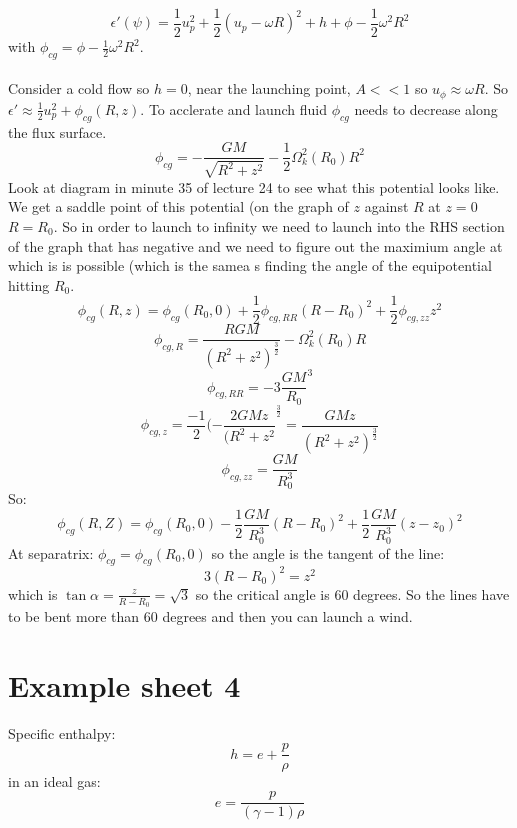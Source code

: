 \documentclass{article}
\begin{document}
$$
\epsilon'(\psi) = \frac{1}{2} u^2_p + \frac{1}{2}(u_p - \omega R)^2 + h + \phi - \frac{1}{2} \omega^2 R^2
$$
with $\phi_{cg} = \phi - \frac{1}{2} \omega^2 R^2$.\\\\
Consider a cold flow so $h = 0$, near the launching point, $A<<1$ so $u_{\phi} \approx \omega R$. So $\epsilon' \approx \frac{1}{2} u_p^2 + \phi_{cg}(R,z)$. To acclerate and launch fluid $\phi_{cg}$ needs to decrease along the flux surface.
$$
\phi_{cg} = - \frac{GM}{\sqrt{R^2 + z^2}} - \frac{1}{2} \Omega^2_k(R_0) R^2
$$
Look at diagram in minute 35 of lecture 24 to see what this potential looks like. We get a saddle point of this potential (on the graph of $z$ against $R$ at $z = 0$ $R=R_0$. So in order to launch to infinity we need to launch into the RHS section of the graph that has negative and we need to figure out the maximium angle at which is is possible (which is the samea s finding the angle of the equipotential hitting $R_0$.
$$
\phi_{cg}(R,z) = \phi_{cg}(R_0, 0) + \frac{1}{2} \phi_{cg, RR} (R-R_0)^2 + \frac{1}{2} \phi_{cg, zz} z^2
$$
$$
\phi_{cg,R} = \frac{R GM}{(R^2 + z^2)^{\frac{3}{2}}} - \Omega^2_k(R_0)R
$$
$$
\phi_{cg, RR} = - 3 \frac{GM}{R_0}^3
$$
$$
\phi_{cg, z} = \frac{-1}{2} ( - \frac{2GMz}{(R^2+ z^2}^{\frac{3}{2}} = \frac{GM z}{(R^2+z^2)^{\frac{3}{2}}}
$$
$$
\phi_{cg, zz} = \frac{GM}{R_0^3}
$$
So:
$$
\phi_{cg}(R,Z) = \phi_{cg}(R_0,0) - \frac{1}{2} \frac{GM}{R_0^3}(R-R_0)^2 + \frac{1}{2} \frac{GM}{R_0^3} (z-z_0)^2
$$
At separatrix: $\phi_{cg} = \phi_{cg}(R_0,0)$ so the angle is the tangent of the line:
$$
3(R-R_0)^2 = z^2 
$$
which is $\tan \alpha = \frac{z}{R-R_0} = \sqrt{3}$ so the critical angle is 60 degrees. So the lines have to be bent more than 60 degrees and then you can launch a wind.
\section{Example sheet 4}
Specific enthalpy:
$$
h = e + \frac{p}{\rho}
$$
in an ideal gas: 
$$
e= \frac{p}{(\gamma -1)\rho}
$$
\end{document}
